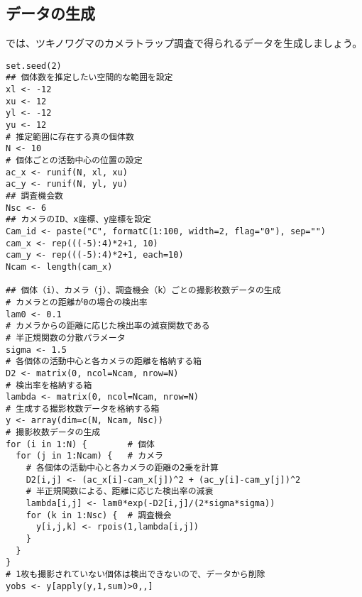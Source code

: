 \subsection{データの生成}
では、ツキノワグマのカメラトラップ調査で得られるデータを生成しましょう。
\begin{verbatim}
set.seed(2)
## 個体数を推定したい空間的な範囲を設定
xl <- -12
xu <- 12
yl <- -12
yu <- 12
# 推定範囲に存在する真の個体数
N <- 10
# 個体ごとの活動中心の位置の設定
ac_x <- runif(N, xl, xu)
ac_y <- runif(N, yl, yu)
## 調査機会数
Nsc <- 6
## カメラのID、x座標、y座標を設定
Cam_id <- paste("C", formatC(1:100, width=2, flag="0"), sep="")
cam_x <- rep(((-5):4)*2+1, 10)
cam_y <- rep(((-5):4)*2+1, each=10)
Ncam <- length(cam_x)

## 個体（i）、カメラ（j）、調査機会（k）ごとの撮影枚数データの生成
# カメラとの距離が0の場合の検出率
lam0 <- 0.1
# カメラからの距離に応じた検出率の減衰関数である
# 半正規関数の分散パラメータ
sigma <- 1.5
# 各個体の活動中心と各カメラの距離を格納する箱
D2 <- matrix(0, ncol=Ncam, nrow=N)
# 検出率を格納する箱
lambda <- matrix(0, ncol=Ncam, nrow=N)
# 生成する撮影枚数データを格納する箱
y <- array(dim=c(N, Ncam, Nsc))
# 撮影枚数データの生成
for (i in 1:N) {        # 個体
  for (j in 1:Ncam) {   # カメラ
    # 各個体の活動中心と各カメラの距離の2乗を計算
    D2[i,j] <- (ac_x[i]-cam_x[j])^2 + (ac_y[i]-cam_y[j])^2
    # 半正規関数による、距離に応じた検出率の減衰
    lambda[i,j] <- lam0*exp(-D2[i,j]/(2*sigma*sigma))
    for (k in 1:Nsc) {  # 調査機会
      y[i,j,k] <- rpois(1,lambda[i,j])
    }
  }
}
# 1枚も撮影されていない個体は検出できないので、データから削除
yobs <- y[apply(y,1,sum)>0,,]
\end{verbatim}

